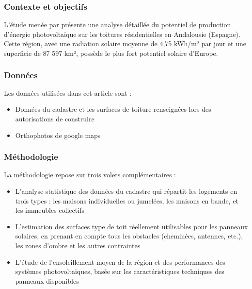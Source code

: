 \subsubsection{Contexte et objectifs}
\par{L'étude menée par \citeauthor{ordonez_analysis_2010} \cite{ordonez_analysis_2010} présente une analyse détaillée du potentiel de production d'énergie photovoltaïque sur les toitures résidentielles en Andalousie (Espagne). Cette région, avec une radiation solaire moyenne de 4,75 kWh/m² par jour et une superficie de 87 597 km², possède le plus fort potentiel solaire d'Europe.}

\subsubsection{Données}
\par{Les données utilisées dans cet article sont :}
\begin{itemize}
    \item Données du cadastre et les surfaces de toiture renseignées lors des autorisations de construire
    \item Orthophotos de google maps
\end{itemize}

\subsubsection{Méthodologie}
\par{La méthodologie repose sur trois volets complémentaires :}
\begin{itemize}
    \item L'analyse statistique des données du cadastre qui répartit les logements en trois types : les maisons individuelles ou jumelées, les maisons en bande, et les immeubles collectifs
    \item L'estimation des surfaces type de toit réellement utilisables pour les panneaux solaires, en prenant en compte tous les obstacles (cheminées, antennes, etc.), les zones d'ombre et les autres contraintes
    \item L'étude de l'ensoleillement moyen de la région et des performances des systèmes photovoltaïques, basée sur les caractéristiques techniques des panneaux disponibles
\end{itemize}

